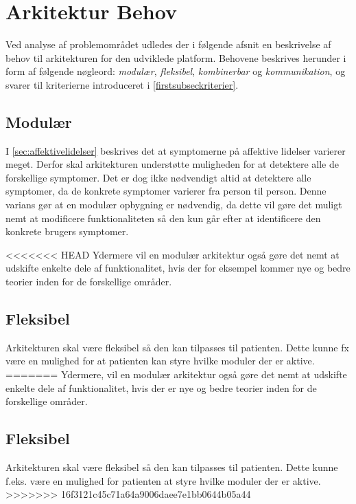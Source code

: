 \section{Arkitektur Behov}\label{arkitekturkrav}
Ved analyse af problemområdet udledes der i følgende afsnit en beskrivelse af behov til arkitekturen for den udviklede platform.
Behovene beskrives herunder i form af følgende nøgleord: \textit{modulær}, \textit{fleksibel}, \textit{kombinerbar} og \textit{kommunikation}, og svarer til kriterierne introduceret i \cref{firstsubseckriterier}.

\subsection{Modulær}\label{arkitekturkrav::modulaer}
I \cref{sec:affektivelidelser} beskrives det at symptomerne på affektive lidelser varierer meget.
Derfor skal arkitekturen understøtte muligheden for at detektere alle de forskellige symptomer.
Det er dog ikke nødvendigt altid at detektere alle symptomer, da de konkrete symptomer varierer fra person til person.
Denne varians gør at en modulær opbygning er nødvendig, da dette vil gøre det muligt nemt at modificere funktionaliteten så den kun går efter at identificere den konkrete brugers symptomer.

<<<<<<< HEAD
Ydermere vil en modulær arkitektur også gøre det nemt at udskifte enkelte dele af funktionalitet, hvis der for eksempel kommer nye og bedre teorier inden for de forskellige områder.

\subsection{Fleksibel}\label{arkitekturkrav::fleksibel}
Arkitekturen skal være fleksibel så den kan tilpasses til patienten.
Dette kunne fx være en mulighed for at patienten kan styre hvilke moduler der er aktive.
=======
Ydermere, vil en modulær arkitektur også gøre det nemt at udskifte enkelte dele af funktionalitet, hvis der er nye og bedre teorier inden for de forskellige områder.

\subsection{Fleksibel}\label{arkitekturkrav::fleksibel}
Arkitekturen skal være fleksibel så den kan tilpasses til patienten.
Dette kunne f.eks. være en mulighed for patienten at styre hvilke moduler der er aktive.
>>>>>>> 16f3121c45c71a64a9006daee7e1bb0644b05a44

